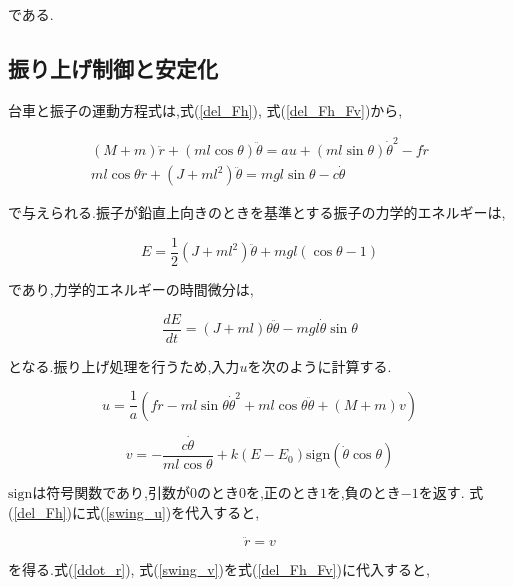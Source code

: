 である.

\subsection{振り上げ制御と安定化}
台車と振子の運動方程式は,式(\ref{del_Fh}), 式(\ref{del_Fh_Fv})から,

$$
    \begin{array}{c}
        (M + m) \ddot{r} + (ml\cos{\theta}) \ddot{\theta} 
            = au + (ml\sin{\theta}) \dot{\theta}^2 - f \dot{r} \\
        ml\cos{\theta} \ddot{r} + (J + ml^2) \ddot{\theta} 
            = mgl\sin{\theta} -c \dot{\theta}
    \end{array}
$$

で与えられる.振子が鉛直上向きのときを基準とする振子の力学的エネルギーは,

\begin{equation}
    E = \frac{1}{2} \left( J + ml^2 \right) \ddot{\theta}
        + mgl \left( \cos{\theta} - 1 \right)
\end{equation}

であり,力学的エネルギーの時間微分は,

\begin{equation}
    \frac{dE}{dt} = (J + ml) \theta \ddot{\theta}
                    - mgl \dot{\theta} \sin{\theta}
    \label{dEdt}
\end{equation}

となる.振り上げ処理を行うため,入力$u$を次のように計算する.

\begin{equation}
    u = \frac{1}{a}
        \left(
            f \dot{r} - ml \sin{\theta} \dot{\theta}^2 + ml \cos{\theta} \ddot{\theta}
            + (M + m)v
        \right)
    \label{swing_u}
\end{equation}

\begin{equation}
    v = - \frac{c \dot{\theta}}{ml\cos{\theta}} 
        + k(E - E_{0}) \mbox{sign}(\dot{\theta}\cos{\theta})
    \label{swing_v}
\end{equation}

$\mbox{sign}$は符号関数であり,引数が$0$のとき$0$を,正のとき$1$を,負のとき$-1$を返す.
式(\ref{del_Fh})に式(\ref{swing_u})を代入すると,

\begin{equation}
    \ddot{r} = v
    \label{ddot_r}
\end{equation}

を得る.式(\ref{ddot_r}), 式(\ref{swing_v})を式(\ref{del_Fh_Fv})に代入すると,

